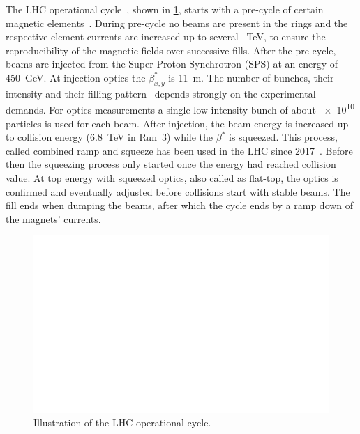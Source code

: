 The LHC operational cycle~\cite{Report:LHCModes}, shown in \cref{figure:lhc_cycle}, starts with a pre-cycle of certain magnetic elements~\cite{Report:LHCMagnetsPreCycles}.
During pre-cycle no beams are present in the rings and the respective element currents are increased up to several \qty{}{\tera\electronvolt}, to ensure the reproducibility of the magnetic fields over successive fills.
After the pre-cycle, beams are injected from the Super Proton Synchrotron (SPS) at an energy of \qty{450}{\giga\electronvolt}.
At injection optics the \(\beta^{\ast}_{x,y}\) is \qty{11}{\metre}.
The number of bunches, their intensity and their filling pattern~\cite{Report:LHCStandardFillingSchemes} depends strongly on the experimental demands.
For optics measurements a single low intensity bunch of about \num{e10} particles is used for each beam.
After injection, the beam energy is increased up to collision energy (\qty{6.8}{\tera\electronvolt} in Run~3) while the \(\beta^{\ast}\) is squeezed.
This process, called combined ramp and squeeze has been used in the LHC since 2017~\cite{IPAC:Camillocci:CombinedRampAndSqueeze}.
Before then the squeezing process only started once the energy had reached collision value.
At top energy with squeezed optics, also called as flat-top, the optics is confirmed and eventually adjusted before collisions start with stable beams.
The fill ends when dumping the beams, after which the cycle ends by a ramp down of the magnets' currents.

\begin{figure}[h]
    \centering
    \includegraphics*[width=0.9\linewidth]{Figures/Optics_Measurements_Corrections_at_LHC/lhc_cycle.pdf}
    \caption{Illustration of the LHC operational cycle.}
    \label{figure:lhc_cycle}
  \end{figure}


